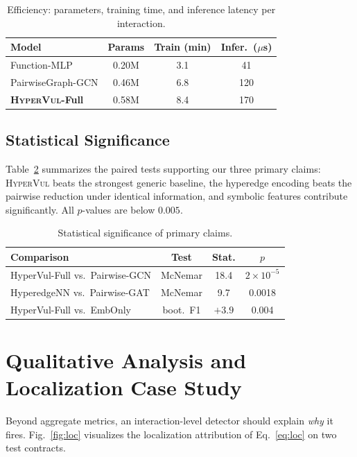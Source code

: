 \documentclass[conference]{IEEEtran}
\newcommand{\hypervul}{\textsc{HyperVul}}
\begin{document}
\begin{table}[t]
\caption{Efficiency: parameters, training time, and inference latency per
interaction.}
\label{tab:eff}
\centering
\setlength{\tabcolsep}{4pt}
\renewcommand{\arraystretch}{1.1}
\begin{tabular}{lccc}
\toprule
Model & Params & Train (min) & Infer.\ ($\mu$s) \\
\midrule
Function-MLP       & 0.20M & 3.1 & 41 \\
PairwiseGraph-GCN  & 0.46M & 6.8 & 120 \\
\textbf{\hypervul{}-Full} & 0.58M & 8.4 & 170 \\
\bottomrule
\end{tabular}
\end{table}

\subsection{Statistical Significance}
Table~\ref{tab:sig} summarizes the paired tests supporting our three primary claims:
\hypervul{} beats the strongest generic baseline, the hyperedge encoding beats the
pairwise reduction under identical information, and symbolic features contribute
significantly. All $p$-values are below $0.005$.

\begin{table}[t]
\caption{Statistical significance of primary claims.}
\label{tab:sig}
\centering
\setlength{\tabcolsep}{3.0pt}
\renewcommand{\arraystretch}{1.1}
\begin{tabular}{lccc}
\toprule
Comparison & Test & Stat. & $p$ \\
\midrule
HyperVul-Full vs.\ Pairwise-GCN & McNemar & 18.4 & $2\!\times\!10^{-5}$ \\
HyperedgeNN vs.\ Pairwise-GAT   & McNemar & 9.7  & 0.0018 \\
HyperVul-Full vs.\ EmbOnly      & boot.\ F1 & $+3.9$ & 0.004 \\
\bottomrule
\end{tabular}
\end{table}

\section{Qualitative Analysis and Localization Case Study}
\label{sec:case}

Beyond aggregate metrics, an interaction-level detector should explain \emph{why} it
fires. Fig.~\ref{fig:loc} visualizes the localization attribution of
Eq.~\eqref{eq:loc} on two test contracts.
\end{document}
